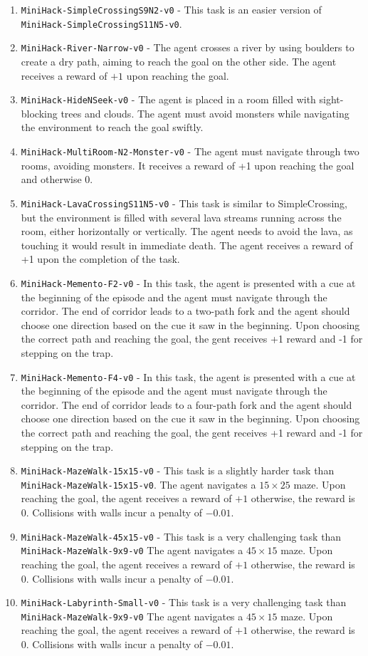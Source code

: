 \documentclass[]{fairmeta}
\begin{document}
\begin{enumerate}
    \item \texttt{MiniHack-SimpleCrossingS9N2-v0} - This task is an easier version of \texttt{MiniHack-SimpleCrossingS11N5-v0}.
    \item \texttt{MiniHack-River-Narrow-v0} - The agent crosses a river by using boulders to create a dry path, aiming to reach the goal on the other side. The agent receives a reward of $+1$ upon reaching the goal.
    \item \texttt{MiniHack-HideNSeek-v0} - The agent is placed in a room filled with sight-blocking trees and clouds. The agent must avoid monsters while navigating the environment to reach the goal swiftly.
    \item \texttt{MiniHack-MultiRoom-N2-Monster-v0} -  The agent must navigate through two rooms, avoiding monsters. It receives a reward of +1 upon reaching the goal and otherwise 0.
    \item \texttt{MiniHack-LavaCrossingS11N5-v0} - This task is similar to SimpleCrossing, but the environment is filled with several lava streams running across the room, either horizontally or vertically. The agent needs to avoid the lava, as touching it would result in immediate death.
    The agent receives a reward of +1 upon the completion of the task.
    \item \texttt{MiniHack-Memento-F2-v0} - In this task, the agent is presented with a cue at the beginning of the episode and the agent must navigate through the corridor. The end of corridor leads to a two-path fork and the agent should choose one direction based on the cue it saw in the beginning. Upon choosing the correct path and reaching the goal, the gent receives +1 reward and -1 for stepping on the trap.
    \item \texttt{MiniHack-Memento-F4-v0} - In this task, the agent is presented with a cue at the beginning of the episode and the agent must navigate through the corridor. The end of corridor leads to a four-path fork and the agent should choose one direction based on the cue it saw in the beginning. Upon choosing the correct path and reaching the goal, the gent receives +1 reward and -1 for stepping on the trap.
    \item \texttt{MiniHack-MazeWalk-15x15-v0} - This task is a slightly harder task than \texttt{MiniHack-MazeWalk-15x15-v0}. The agent navigates a $15 \times 25$ maze. Upon reaching the goal, the agent receives a reward of $+1$ otherwise, the reward is $0$. Collisions with walls incur a penalty of $-0.01$.
    \item \texttt{MiniHack-MazeWalk-45x15-v0} - This task is a very challenging task than \texttt{MiniHack-MazeWalk-9x9-v0} The agent navigates a $45 \times 15$ maze. Upon reaching the goal, the agent receives a reward of $+1$ otherwise, the reward is $0$. Collisions with walls incur a penalty of $-0.01$.
    \item \texttt{MiniHack-Labyrinth-Small-v0} - This task is a very challenging task than \texttt{MiniHack-MazeWalk-9x9-v0} The agent navigates a $45 \times 15$ maze. Upon reaching the goal, the agent receives a reward of $+1$ otherwise, the reward is $0$. Collisions with walls incur a penalty of $-0.01$.
\end{enumerate}
\end{document}
